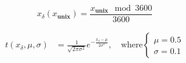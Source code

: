 \begin{equation}\label{eq:unix_time}
    x_\delta(x_{\textbf{unix}}) = \frac{x_\textbf{unix}\mod 3600}{3600}
\end{equation}

\begin{align*}
    t(x_\delta, \mu, \sigma) &= \frac{1}{\sqrt{2\pi\sigma^2}} e^{-\frac{x_\delta-\mu}{2\sigma^2}}, \quad \text{where}
    \begin{cases}
    \mu = 0.5 \\
    \sigma = 0.1 
    \end{cases}
\end{align*}
